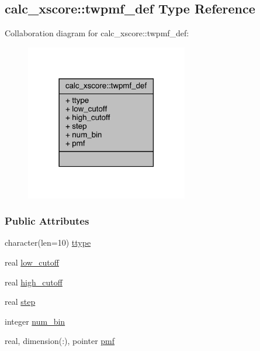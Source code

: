 \hypertarget{structcalc__xscore_1_1twpmf__def}{\subsection{calc\-\_\-xscore\-:\-:twpmf\-\_\-def Type Reference}
\label{structcalc__xscore_1_1twpmf__def}
}


Collaboration diagram for calc\-\_\-xscore\-:\-:twpmf\-\_\-def\-:
\nopagebreak
\begin{figure}[H]
\begin{center}
\leavevmode
\includegraphics[width=201pt]{structcalc__xscore_1_1twpmf__def__coll__graph}
\end{center}
\end{figure}
\subsubsection*{Public Attributes}
\begin{DoxyCompactItemize}
\item 
character(len=10) \hyperlink{structcalc__xscore_1_1twpmf__def_a0fda2c297db50fad272ca607d7bbac99}{ttype}
\item 
real \hyperlink{structcalc__xscore_1_1twpmf__def_ab755f519cb9d26f7707eb13ac4f07821}{low\-\_\-cutoff}
\item 
real \hyperlink{structcalc__xscore_1_1twpmf__def_afb807b7e8f286df937964bb273a77f7e}{high\-\_\-cutoff}
\item 
real \hyperlink{structcalc__xscore_1_1twpmf__def_ad1ae31ed8e6abb44c619bb499552b3af}{step}
\item 
integer \hyperlink{structcalc__xscore_1_1twpmf__def_a1289d957f5bb72b7d3cb255539fac6cf}{num\-\_\-bin}
\item 
real, dimension(\-:), pointer \hyperlink{structcalc__xscore_1_1twpmf__def_a1f27cbd9f8d32604777089b06563a443}{pmf}
\end{DoxyCompactItemize}


